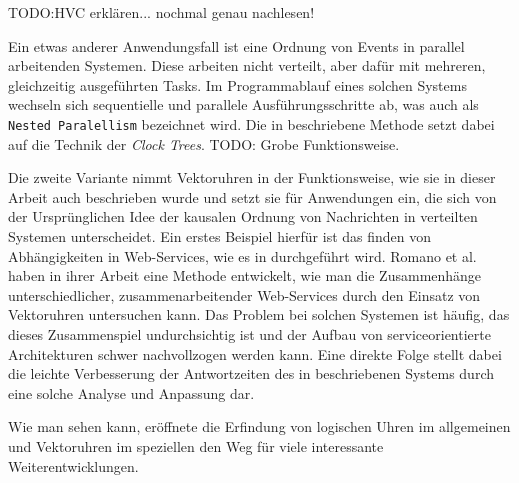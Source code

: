 TODO:HVC erklären... nochmal genau nachlesen!

Ein etwas anderer Anwendungsfall ist eine Ordnung von Events in parallel arbeitenden Systemen. Diese arbeiten nicht verteilt, aber dafür mit mehreren, gleichzeitig ausgeführten Tasks. Im Programmablauf eines solchen Systems wechseln sich sequentielle und parallele Ausführungsschritte ab, was auch als \texttt{Nested Paralellism} bezeichnet wird. Die in \cite{Audenaert1997} beschriebene Methode setzt dabei auf die Technik der \textit{Clock Trees}. 
TODO: Grobe Funktionsweise.



Die zweite Variante nimmt Vektoruhren in der Funktionsweise, wie sie in dieser Arbeit auch beschrieben wurde und setzt sie für Anwendungen ein, die sich von der Ursprünglichen Idee der kausalen Ordnung von Nachrichten in verteilten Systemen unterscheidet. Ein erstes Beispiel hierfür ist das finden von Abhängigkeiten in Web-Services, wie es in \cite{Romano2011} durchgeführt wird. Romano et al. haben in ihrer Arbeit eine Methode entwickelt, wie man die Zusammenhänge unterschiedlicher, zusammenarbeitender Web-Services durch den Einsatz von Vektoruhren untersuchen kann. Das Problem bei solchen Systemen ist häufig, das dieses Zusammenspiel undurchsichtig ist und der Aufbau von serviceorientierte Architekturen schwer nachvollzogen werden kann. Eine direkte Folge stellt dabei die leichte Verbesserung der Antwortzeiten des in \cite{Romano2011} beschriebenen Systems durch eine solche Analyse und Anpassung dar.


Wie man sehen kann, eröffnete die Erfindung von logischen Uhren im allgemeinen und Vektoruhren im speziellen den Weg für viele interessante Weiterentwicklungen. 
